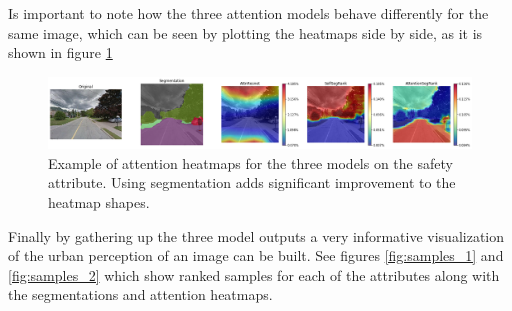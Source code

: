 Is important to note how the three attention models behave differently for the same image, which can be seen by
plotting the heatmaps side by side, as it is shown in figure \ref{fig:model_comparison}

\begin{figure}[ht]
	\begin{center}
	\includegraphics[width=1\textwidth]{./figures/model_comparison.png}
	\caption[Attention by segmentation class heatmaps.]{
		Example of attention heatmaps for the three models on the safety attribute.
		Using segmentation adds significant improvement to the heatmap shapes.
        }
	\label{fig:model_comparison}
	\end{center}
\end{figure}

Finally by gathering up the three model outputs a very informative
visualization of the urban perception of an image can be built.
See figures \ref{fig:samples_1} and \ref{fig:samples_2} which show ranked
samples for each of the attributes along with the segmentations and attention
heatmaps.

